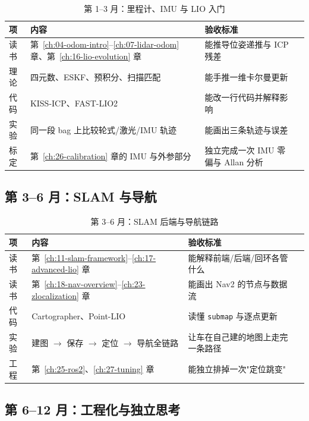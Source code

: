 \begin{table}[htbp]
  \centering
  \caption{第 1--3 月：里程计、IMU 与 LIO 入门}\label{tab:30-s2}
  \small
  \begin{tabular}{lp{3.4cm}p{3.6cm}p{3.6cm}}
    \toprule
    项 & 内容 & 验收标准 \\
    \midrule
    读书 & 第~\ref{ch:04-odom-intro}--\ref{ch:07-lidar-odom} 章、第~\ref{ch:16-lio-evolution} 章 & 能推导位姿递推与 ICP 残差 \\
    理论 & 四元数、ESKF、预积分、扫描匹配 & 能手推一维卡尔曼更新 \\
    代码 & KISS-ICP、FAST-LIO2 & 能改一行代码并解释影响 \\
    实验 & 同一段 bag 上比较轮式/激光/IMU 轨迹 & 能画出三条轨迹与误差 \\
    标定 & 第~\ref{ch:26-calibration} 章的 IMU 与外参部分 & 独立完成一次 IMU 零偏与 Allan 分析 \\
    \bottomrule
  \end{tabular}
\end{table}

\subsection{第 3--6 月：SLAM 与导航}

\begin{table}[htbp]
  \centering
  \caption{第 3--6 月：SLAM 后端与导航链路}\label{tab:30-s3}
  \small
  \begin{tabular}{lp{3.4cm}p{3.6cm}p{3.6cm}}
    \toprule
    项 & 内容 & 验收标准 \\
    \midrule
    读书 & 第~\ref{ch:11-slam-framework}--\ref{ch:17-advanced-lio} 章 & 能解释前端/后端/回环各管什么 \\
    读书 & 第~\ref{ch:18-nav-overview}--\ref{ch:23-zlocalization} 章 & 能画出 Nav2 的节点与数据流 \\
    代码 & Cartographer、Point-LIO & 读懂 \lstinline{submap} 与逐点更新 \\
    实验 & 建图 $\to$ 保存 $\to$ 定位 $\to$ 导航全链路 & 让车在自己建的地图上走完一条路径 \\
    工程 & 第~\ref{ch:25-ros2}、\ref{ch:27-tuning} 章 & 能独立排掉一次"定位跳变" \\
    \bottomrule
  \end{tabular}
\end{table}

\subsection{第 6--12 月：工程化与独立思考}


